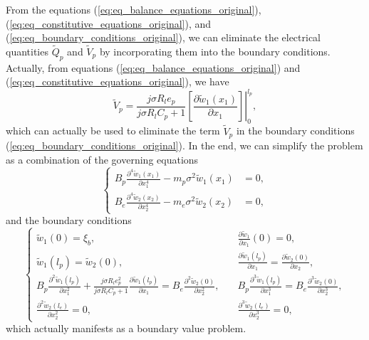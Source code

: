 \documentclass{elsarticle}
\begin{document}
From the equations (\ref{eq:eq_balance_equations_original}), (\ref{eq:eq_constitutive_equations_original}), and (\ref{eq:eq_boundary_conditions_original}), we can eliminate the electrical quantities $\tilde{Q}_p$ and $\tilde{V}_p$ by incorporating them into the boundary conditions. Actually, from equations (\ref{eq:eq_balance_equations_original}) and (\ref{eq:eq_constitutive_equations_original}), we have
\begin{equation}
    \tilde{V}_p = \frac{j \sigma R_l e_p}{j \sigma R_l C_p + 1} \left.\left[ \frac{\partial \tilde{w}_1(x_1)}{\partial x_1} \right]\right|^{l_p}_0,
\end{equation}
which can actually be used to eliminate the term $\tilde{V}_p$ in the boundary conditions (\ref{eq:eq_boundary_conditions_original}). In the end, we can simplify the problem as a combination of the governing equations
\begin{equation}
    \left\{\begin{aligned}
        B_p \frac{\partial^4 \tilde{w}_1(x_1)}{\partial x_1^4} - m_p \sigma^2 \tilde{w}_1(x_1) &= 0, \\
        B_e \frac{\partial^4 \tilde{w}_2(x_2)}{\partial x_2^4} - m_e \sigma^2 \tilde{w}_2(x_2) &= 0, 
    \end{aligned}\right.
    \label{eq:eq_balance_equations_converted}
\end{equation}
and the boundary conditions
\begin{equation}
    \left\{\begin{aligned}
        \tilde{w}_1(0) = \xi_b , &\quad \frac{\partial \tilde{w}_1}{\partial x_1} (0) = 0, \\
        \tilde{w}_1(l_p) = \tilde{w}_2(0), &\quad \frac{\partial \tilde{w}_1(l_p)}{\partial x_1} = \frac{\partial \tilde{w}_2(0)}{\partial x_2}, \\
        B_p \frac{\partial^2 \tilde{w}_1(l_p)}{\partial x_1^2} + \frac{j \sigma R_l e_p^2}{j \sigma R_l C_p + 1}  \frac{\partial \tilde{w}_1(l_p)}{\partial x_1} = B_e \frac{\partial^2 \tilde{w}_2(0)}{\partial x_2^2} , &\quad B_p \frac{\partial^3 \tilde{w}_1(l_p)}{\partial x_1^3} = B_e \frac{\partial^3 \tilde{w}_2(0)}{\partial x_2^3}, \\
        \frac{\partial^2 \tilde{w}_2(l_e)}{\partial x_2^2} = 0 , &\quad \frac{\partial^3 \tilde{w}_2(l_e)}{\partial x_2^3} = 0,
    \end{aligned}\right.
    \label{eq:eq_boundary_conditions_converted}
\end{equation}
which actually manifests as a boundary value problem.
\end{document}
